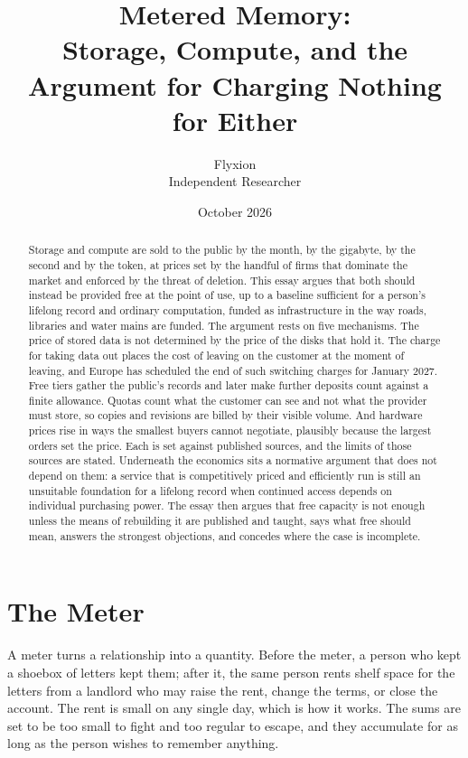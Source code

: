 \documentclass[11pt]{article}
\title{Metered Memory:\\[0.3em]
\large Storage, Compute, and the Argument for Charging Nothing for Either}
\author{Flyxion\\Independent Researcher}
\date{October 2026}
\begin{document}
\maketitle

\begin{abstract}
\noindent Storage and compute are sold to the public by the month, by the gigabyte, by the second and by the token, at prices set by the handful of firms that dominate the market and enforced by the threat of deletion. This essay argues that both should instead be provided free at the point of use, up to a baseline sufficient for a person's lifelong record and ordinary computation, funded as infrastructure in the way roads, libraries and water mains are funded. The argument rests on five mechanisms. The price of stored data is not determined by the price of the disks that hold it. The charge for taking data out places the cost of leaving on the customer at the moment of leaving, and Europe has scheduled the end of such switching charges for January 2027. Free tiers gather the public's records and later make further deposits count against a finite allowance. Quotas count what the customer can see and not what the provider must store, so copies and revisions are billed by their visible volume. And hardware prices rise in ways the smallest buyers cannot negotiate, plausibly because the largest orders set the price. Each is set against published sources, and the limits of those sources are stated. Underneath the economics sits a normative argument that does not depend on them: a service that is competitively priced and efficiently run is still an unsuitable foundation for a lifelong record when continued access depends on individual purchasing power. The essay then argues that free capacity is not enough unless the means of rebuilding it are published and taught, says what free should mean, answers the strongest objections, and concedes where the case is incomplete.
\end{abstract}

\section{The Meter}

A meter turns a relationship into a quantity. Before the meter, a person who kept a shoebox of letters kept them; after it, the same person rents shelf space for the letters from a landlord who may raise the rent, change the terms, or close the account. The rent is small on any single day, which is how it works. The sums are set to be too small to fight and too regular to escape, and they accumulate for as long as the person wishes to remember anything.
\end{document}
